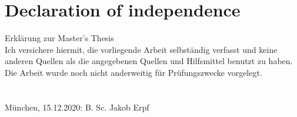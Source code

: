 \documentclass[a4paper,12pt]{report}
\begin{document}
\pagebreak
{}
\chapter*{Declaration of independence}
Erklärung zur Master’s Thesis
\newline \\
Ich versichere hiermit, die vorliegende Arbeit selbständig verfasst und keine anderen Quellen als die angegebenen Quellen und Hilfsmittel benutzt zu haben. Die Arbeit wurde noch nicht anderweitig für Prüfungszwecke vorgelegt. 
\newline \\ \\ \\
München, 15.12.2020: \hrulefill \newline
\hspace*{0mm}\phantom{München, 11.12.2020: } B. Sc. Jakob Erpf
\end{document}
